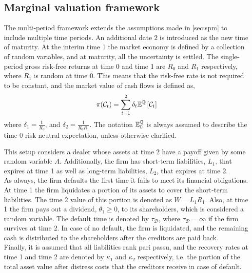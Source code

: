 \documentclass[main.tex]{subfiles}
\begin{document}
    \subsection{Marginal valuation framework}
        The multi-period framework extends the assumptions made in \cref{sec:spm} to include multiple time periods.
        An additional date $2$ is introduced as the new time of maturity.
        At the interim time 1 the market economy is defined by a collection of random variables,
        and at maturity, all the uncertainty is settled. 
        The single-period gross risk-free returns at time 0 and time 1 are $R_0$ and $R_1$ respectively, where $R_1$ is random at time 0.
        This means that the risk-free rate is not required to be constant,
        and the market value of cash flows is defined as,
        \begin{equation}
        \pi(\mathcal{C}_{t}) = \sum_{t=1}^{2}\delta_t \mathbb{E}^{\mathbb{Q}}\left[\mathcal{C}_{t}\right]
        \end{equation}
        where $\delta_1 = \frac{1}{R_0}$,
        and $\delta_2 = \frac{1}{R_{0}R_{1}}$.
        The notation $\mathbb{E}_{0}^{\mathbb{Q}}$ is always assumed to describe the time 0 risk-neutral expectation, unless otherwise clarified.

        This setup considers a dealer whose assets at time 2 have a payoff given by some random variable $A$.
        Additionally, the firm has short-term liabilities, $L_1$, that expires at time 1 as well as long-term liabilities, $L_2$, that expires at time 2.
        \\
        As always, the firm defaults the first time it fails to meet its financial obligations.
        At time 1 the firm liquidates a portion of its assets to cover the short-term liabilities.
        The time 2 value of this portion is denoted as $W = L_1 R_1$.
        Also, at time 1 the firm pays out a dividend, $\theta_1 \geq 0$, to its shareholders,
        which is considered a random variable.
        The default time is denoted by $\tau_{\mathcal{D}}$,
        where $\tau_{\mathcal{D}} = \infty$ if the firm survives at time 2.
        In case of no default, the firm is liquidated, and the remaining cash is distributed to the shareholders after the creditors are paid back.
        \\
        Finally, it is assumed that all liabilities rank pari passu,
        and the recovery rates at time 1 and time 2 are denoted by $\kappa_1$ and $\kappa_2$ respectively,
        i.e. the portion of the total asset value after distress costs that the creditors receive in case of default.
\end{document}
